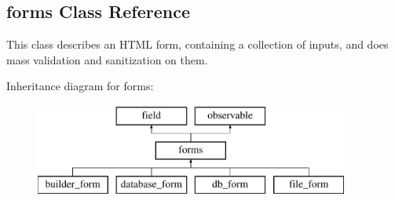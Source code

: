 \hypertarget{classforms}{\subsection{forms Class Reference}
\label{classforms}
}


This class describes an H\-T\-M\-L form, containing a collection of inputs, and does mass validation and sanitization on them.  


Inheritance diagram for forms\-:\begin{figure}[H]
\begin{center}
\leavevmode
\includegraphics[height=3.000000cm]{classforms}
\end{center}
\end{figure}
